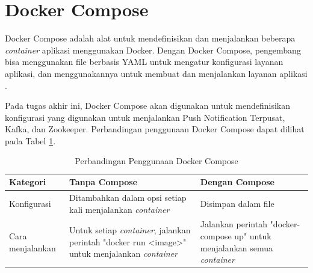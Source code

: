 \section{Docker Compose}
\par Docker Compose adalah alat untuk mendefinisikan dan menjalankan beberapa \textit{container} aplikasi menggunakan Docker. Dengan Docker Compose, pengembang bisa menggunakan file berbasis YAML untuk mengatur konfigurasi layanan aplikasi, dan menggunakannya untuk membuat dan menjalankan layanan aplikasi \cite{docker-compose-online}.
\par Pada tugas akhir ini, Docker Compose akan digunakan untuk mendefinisikan konfigurasi yang digunakan untuk menjalankan Push Notification Terpusat, Kafka, dan Zookeeper. Perbandingan penggunaan Docker Compose dapat dilihat pada Tabel \ref{t:perbandingan_docker_compose}.
\begin{longtable}{|p{2cm}|p{3.5cm}|p{3.5cm}|}
	\caption{Perbandingan Penggunaan Docker Compose} \label{t:perbandingan_docker_compose} \\ \hline
	\rowcolor{lightgray} Kategori & Tanpa Compose & Dengan Compose \\ \hline
	\endhead
	Konfigurasi & Ditambahkan dalam opsi setiap kali menjalankan \textit{container} & Disimpan dalam file \\ \hline
	Cara menjalankan & Untuk setiap \textit{container}, jalankan perintah "docker run <image>" untuk menjalankan \textit{container} & Jalankan perintah "docker-compose up" untuk menjalankan semua \textit{container} \\ \hline
\end{longtable}

